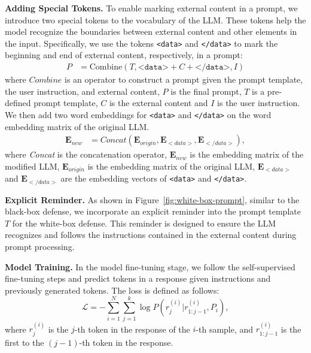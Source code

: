 \textbf{Adding Special Tokens.}
To enable marking external content in a prompt, we introduce two special tokens to the vocabulary of the LLM. These tokens help the model recognize the boundaries between external content and other elements in the input. Specifically, we use the tokens \texttt{<data>} and \texttt{</data>} to mark the beginning and end of external content, respectively, in a prompt:
\begin{equation} 
\begin{aligned}
P &= \text{Combine}(T, \texttt{<data>} + C + \texttt{</data>}, I)
\end{aligned}
\end{equation}
where $\textit{Combine}$ is an operator to construct a prompt given the prompt template, the user instruction, and external content, $P$ is the final prompt, $T$ is a pre-defined prompt template, $C$ is the external content and $I$ is the user instruction.
We then add two word embeddings for \texttt{<data>} and \texttt{</data>} on the word embedding matrix of the original LLM.
\begin{equation}
    \begin{aligned}
    \textbf{E}_{new} &= Concat(\textbf{E}_{origin}, \textbf{E}_{<data>}, \textbf{E}_{</data>}),
    \end{aligned}
\end{equation}
where \textit{Concat} is the concatenation operator, $\textbf{E}_{new}$ is the embedding matrix of the modified LLM, $\textbf{E}_{origin}$ is the embedding matrix of the original LLM, $\textbf{E}_{<data>}$ and $\textbf{E}_{</data>}$ are the embedding vectors of \texttt{<data>} and \texttt{</data>}.



\textbf{Explicit Reminder. }
As shown in Figure~\ref{fig:white-box-prompt}, similar to the black-box defense, we incorporate an explicit reminder into the prompt template $T$ for the white-box defense. This reminder is designed to ensure the LLM recognizes and follows the instructions contained in the external content during prompt processing.

\textbf{Model Training. }
In the model fine-tuning stage, we follow the self-supervised fine-tuning steps and predict tokens in a response given instructions and previously generated tokens.
The loss is defined as follows:
\begin{equation} 
\mathcal{L} = -\sum_{i=1}^N \sum_{j=1}^k \log P(r_j^{(i)}|r_{1:j-1}^{(i)}, P_i),
\end{equation}
where $r_j^{(i)}$ is the $j$-th token in the response of the $i$-th sample, and  $r_{1:j-1}^{(i)}$ is the first to the $(j-1)$-th token in the response.



